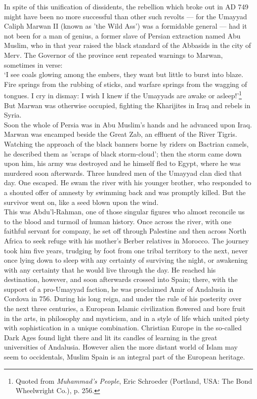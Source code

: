 \documentclass[10pt, twoside]{book}
\begin{document}
In spite of this unification of dissidents, the rebellion which broke out in AD 749 might have been 
no more successful than other such revolts --- for the Umayyad Caliph Marwan II (known as 'the Wild 
Ass') was a formidable general --- had it not been for a man of genius, a former slave of Persian 
extraction named Abu Muslim, who in that year raised the black standard of the Abbasids in the city 
of Merv. The Governor of the province sent repeated warnings to Marwan, sometimes in verse: \\

`I see coals glowing among the embers, they want but little to burst into blaze. Fire springs from the 
rubbing of sticks, and warfare springs from the wagging of tongues. I cry in dismay: I wish I knew if 
the Umayyads are awake or asleep!'\footnote{Quoted from \emph{Muhammad's People}, Eric Schroeder (Portland, USA: The Bond Wheelwright Co.), p. 256.}\\

But Marwan was otherwise occupied, fighting the Kharijites in Iraq and rebels in Syria. \\

Soon the whole of Persia was in Abu Muslim's hands and he advanced upon Iraq. Marwan was encamped 
beside the Great Zab, an effluent of the River Tigris. Watching the approach of the black banners 
borne by riders on Bactrian camels, he described them as 'scraps of black storm-cloud'; then the 
storm came down upon him, his army was destroyed and he himself fled to Egypt, where he was murdered 
soon afterwards. Three hundred men of the Umayyad clan died that day. One escaped. He swam the river 
with his younger brother, who responded to a shouted offer of amnesty by swimming back and was 
promptly killed. But the survivor went on, like a seed blown upon the wind.\\

This was Abdu'l\hyp{}Rahman, one of those singular figures who almost reconcile us to the blood and 
turmoil of human history. Once across the river, with one faithful servant for company, he set off 
through Palestine and then across North Africa to seek refuge with his mother's Berber relatives in 
Morocco. The journey took him five years, trudging by foot from one tribal territory to the next, 
never once lying down to sleep with any certainty of surviving the night, or awakening with any 
certainty that he would live through the day. He reached his destination, however, and soon 
afterwards crossed into Spain; there, with the support of a pro\hyp{}Umayyad faction, he was proclaimed 
Amir of Andalusia in Cordova in 756. During his long reign, and under the rule of his posterity over 
the next three centuries, a European Islamic civilization flowered and bore fruit in the arts, in 
philosophy and mysticism, and in a style of life which united piety with sophistication in a unique 
combination. Christian Europe in the so\hyp{}called Dark Ages found light there and lit its candles of 
learning in the great universities of Andalusia. However alien the more distant world of Islam may 
seem to occidentals, Muslim Spain is an integral part of the European heritage. \\
\end{document}
